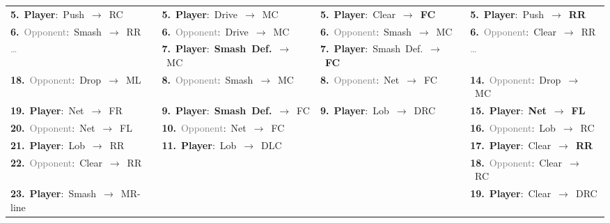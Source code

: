 \begin{table}[t]
\begin{tabularx}{\textwidth}{*{4}{>{\raggedright\arraybackslash}X}}
\mbox{\textbf{5.} \textbf{Player}: Push $\rightarrow$ RC} & \mbox{\textbf{5.} \textbf{Player}: Drive $\rightarrow$ MC} & \mbox{\textbf{5.} \textbf{Player}: Clear $\rightarrow$ \textcolor{frontgreen}{\textbf{FC}}} & \mbox{\textbf{5.} \textbf{Player}: Push $\rightarrow$ \textcolor{driveorange}{\textbf{RR}}} \\
\mbox{\textbf{6.} \textcolor{gray}{Opponent}: Smash $\rightarrow$ RR} & \mbox{\textbf{6.} \textcolor{gray}{Opponent}: Drive $\rightarrow$ MC} & \mbox{\textbf{6.} \textcolor{gray}{Opponent}: Smash $\rightarrow$ MC} & \mbox{\textbf{6.} \textcolor{gray}{Opponent}: Clear $\rightarrow$ RR} \\
\mbox{\textcolor{gray}{\ldots}} & \mbox{\textbf{7.} \textbf{Player}: \textcolor{defensiveblue}{\textbf{Smash Def.}} $\rightarrow$ MC} & \mbox{\textbf{7.} \textbf{Player}: Smash Def. $\rightarrow$ \textcolor{frontgreen}{\textbf{FC}}} & \mbox{\textcolor{gray}{\ldots}} \\
\mbox{\textbf{18.} \textcolor{gray}{Opponent}: Drop $\rightarrow$ ML} & \mbox{\textbf{8.} \textcolor{gray}{Opponent}: Smash $\rightarrow$ MC} & \mbox{\textbf{8.} \textcolor{gray}{Opponent}: Net $\rightarrow$ FC} & \mbox{\textbf{14.} \textcolor{gray}{Opponent}: Drop $\rightarrow$ MC} \\
\mbox{\textbf{19.} \textbf{Player}: Net $\rightarrow$ FR} & \mbox{\textbf{9.} \textbf{Player}: \textcolor{defensiveblue}{\textbf{Smash Def.}} $\rightarrow$ FC} & \mbox{\textbf{9.} \textbf{Player}: Lob $\rightarrow$ DRC} & \mbox{\textbf{15.} \textbf{Player}: \textcolor{driveorange}{\textbf{Net}} $\rightarrow$ \textcolor{driveorange}{\textbf{FL}}} \\
\mbox{\textbf{20.} \textcolor{gray}{Opponent}: Net $\rightarrow$ FL} & \mbox{\textbf{10.} \textcolor{gray}{Opponent}: Net $\rightarrow$ FC} &  & \mbox{\textbf{16.} \textcolor{gray}{Opponent}: Lob $\rightarrow$ RC} \\
\mbox{\textbf{21.} \textbf{Player}: Lob $\rightarrow$ RR} & \mbox{\textbf{11.} \textbf{Player}: Lob $\rightarrow$ DLC} &  & \mbox{\textbf{17.} \textbf{Player}: Clear $\rightarrow$ \textcolor{driveorange}{\textbf{RR}}} \\
\mbox{\textbf{22.} \textcolor{gray}{Opponent}: Clear $\rightarrow$ RR} &  &  & \mbox{\textbf{18.} \textcolor{gray}{Opponent}: Clear $\rightarrow$ RC} \\
\mbox{\textbf{23.} \textbf{Player}: Smash $\rightarrow$ MR-line} &  &  & \mbox{\textbf{19.} \textbf{Player}: Clear $\rightarrow$ DRC} \\
\midrule

\end{tabularx}
\end{table}
